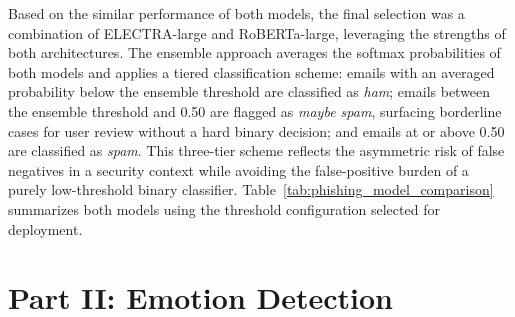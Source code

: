 Based on the similar performance of both models, the final selection was a combination of \acs{ELECTRA}-large and \acs{RoBERTa}-large, leveraging the strengths of both architectures. The ensemble approach averages the softmax probabilities of both models and applies a tiered classification scheme: emails with an averaged probability below the ensemble threshold are classified as \textit{ham}; emails between the ensemble threshold and 0.50 are flagged as \textit{maybe spam}, surfacing borderline cases for user review without a hard binary decision; and emails at or above 0.50 are classified as \textit{spam}. This three-tier scheme reflects the asymmetric risk of false negatives in a security context while avoiding the false-positive burden of a purely low-threshold binary classifier. Table~\ref{tab:phishing_model_comparison} summarizes both models using the threshold configuration selected for deployment.

\begin{table}[htbp]
\centering
\caption{Cross-model comparison on the test set (selected threshold per model).}
\label{tab:phishing_model_comparison}
\end{table}

\section{Part II: Emotion Detection}
\label{sec:emotion_detection}

